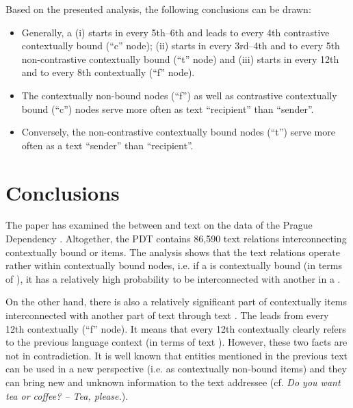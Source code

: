 \documentclass[output=paper]{langsci/langscibook.cls}
\begin{document}
Based on the presented analysis, the following conclusions can be drawn:



\begin{itemize}
\item 

Generally, a  (i) starts in every 5th--6th and leads to every 4th contrastive contextually bound  (``c'' node); (ii) starts in every 3rd--4th and to every 5th non-contrastive contextually bound  (``t'' node) and (iii) starts in every 12th and to every 8th contextually  (``f'' node).


\item 

The contextually non-bound nodes (``f'') as well as contrastive contextually bound (``c'') nodes serve more often as text  ``recipient'' than ``sender''. 


\item 

Conversely, the non-contrastive contextually bound nodes (``t'') serve more often as a text  ``sender'' than ``recipient''.


\end{itemize}

\section{Conclusions\label{rysova_k:sec:Conclusions}}

The paper has examined the  between  and text  on the data of the Prague Dependency . Altogether, the PDT contains 86,590 text  relations interconnecting contextually bound or  items. The analysis shows that the text  relations operate rather within contextually bound nodes, i.e. if a  is contextually bound (in terms of ), it has a relatively high probability to be interconnected with another  in a .




On the other hand, there is also a relatively significant part of contextually  items interconnected with another part of text through text . The  leads from every 12th contextually  (``f'' node). It means that every 12th contextually  clearly refers to the previous language context (in terms of text ). However, these two facts are not in contradiction. It is well known that entities mentioned in the previous text can be used in a new perspective (i.e. as contextually non-bound items) and they can bring new and unknown information to the text addressee (cf. \textit{Do you want tea or coffee? -- Tea, please.}).
\end{document}

